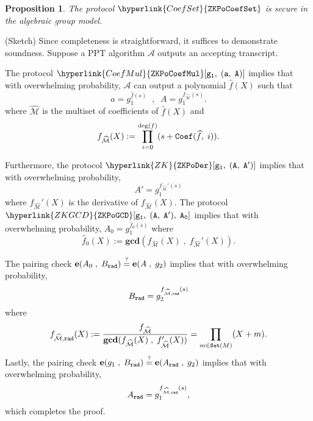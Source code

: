 \documentclass[11pt, lettersize, notitlepage, leqno, footskip=0.6cm]{article}
\newcommand{\ttt}{\texttt}
\newcommand{\sett}{\ttt{Set}}
\newcommand{\mc}{\mathcal}
\newcommand{\mbf}{\mathbf}
\newcommand{\what}{\widehat}
\newcommand{\vs}{\vspace{-0.15cm}}
\newcommand{\noin}{\noindent}
\newcommand{\op}{overwhelming probability}
\newcommand{\sta}{\stackrel{?}{=}}
\newcommand{\GCD}{\mbf{gcd}}
\newcommand{\e}{\mbf{e}}
\newtheorem{Prop}[Thm]{Proposition}
\numberwithin{equation}{section}
\begin{document}
\bigskip

\begin{Prop} The protocol $\hyperlink{CoefSet}{\tt{ZKPoCoefSet}}$ is secure in the algebraic group model.

\end{Prop}


\begin{prf} (Sketch) Since completeness is straightforward, it suffices to demonstrate soundness. Suppose a PPT algorithm $\mc{A}$ outputs an accepting transcript. 

The protocol $\hyperlink{CoefMul}{\tt{ZKPoCoefMul}}[g_1,\;(a,\;A)]$ implies that with \op, $\mc{A}$ can output a polynomial $\what{f}(X)$ such that \vs $$ a = g_1^{\what{f}(s)}\;\;,\;\;A = g_1^{f_{\what{\mc{M}}}(s)}.          $$  where $\what{\mc{M}}$ is the multiset of coefficients of $\what{f}(X)$ and \vs $$ f_{\what{\mc{M}}}(X) := \prod\limits_{i=0}^{\deg(f)} (s+ {\tt{Coef}}(\what{f},\; i)) . $$

\noin Furthermore, the protocol $\hyperlink{ZK}{\tt{ZKPoDer}}[g_1,\;(A,\;A')]$ implies that with \op, $$ A' = g_1^{f_{\what{\mc{M}}}'(s)} $$ where $f_{\what{\mc{M}}}'(X)$ is the derivative of $f_{\what{\mc{M}}}(X)$. The protocol $\hyperlink{ZKGCD}{\tt{ZKPoGCD}}[g_1,\;(A,\;A'),\;A_0]$ implies that with \op, $A_0 = g_1^{\what{f}_0(s)}$ where \vs $$ \what{f}_0(X):= \GCD(f_{\what{\mc{M}}}(X)\;,\;f_{\what{\mc{M}}}'(X) ). $$

\noin The pairing check $\e(A_0\;,\;B_{\tt{rad}})\sta \e(A\;,\;g_2)$ implies that with \op, \vs $$ B_{\tt{rad}} = g_2^{f_{\what{\mc{M}},{\tt{rad}}}(s)}$$ where \vs $$f_{\what{\mc{M}},{\tt{rad}}}(X):= \frac{f_{\what{\mc{M}}}}{\GCD(f_{\what{\mc{M}}}(X)\;,\;f_{\what{\mc{M}}}'(X) )} = \prod\limits_{m \in \sett(M)} (X+m)    . $$ Lastly, the pairing check $\e(g_1\;,\;B_{\tt{rad}})\sta \e(A_{\tt{rad}}\;,\;g_2)$ implies that with \op, \vs $$ A_{\tt{rad}} = g_1^{f_{\what{\mc{M}},{\tt{rad}}}(s)}, $$ which completes the proof. \end{prf}

\bigskip
\end{document}

